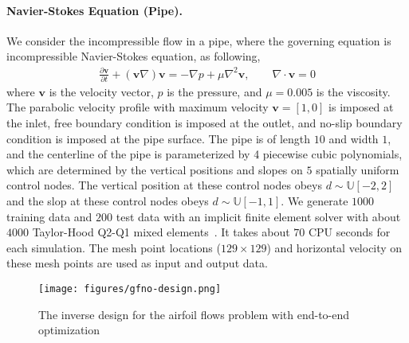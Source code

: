 \documentclass{article}
\begin{document}
\paragraph{Navier-Stokes Equation (Pipe).}
We consider the incompressible flow in a pipe, where the governing equation is incompressible Navier-Stokes equation, as following, 
 \begin{align*}
\frac{\partial \bm{v}}{\partial t} + (\bm{v}  \nabla) \bm{v} =-\nabla p + \mu \nabla^2 \bm{v}, \quad \quad 
\nabla  \cdot  \bm{v} = 0
\end{align*}
where $\bm{v}$ is the velocity vector, $p$ is the pressure, and $\mu = 0.005$ is the viscosity. The parabolic velocity profile with maximum velocity $\bm{v} = [1, 0]$ is imposed at the inlet, free boundary condition is imposed at the outlet, and no-slip boundary condition is imposed at the pipe surface.
The pipe is of length $10$ and width $1$, and the centerline of the pipe is parameterized by 4 piecewise cubic polynomials, which are determined by the vertical positions and slopes on $5$ spatially uniform control nodes. The vertical position at these control nodes obeys  $d\sim \mathbb{U}[-2, 2]$ and the slop at these control nodes obeys  $d\sim \mathbb{U}[-1, 1]$.
We generate $1000$ training data and $200$ test data with an implicit finite element solver with about $4000$ Taylor-Hood Q2-Q1 mixed elements~\cite{huang2020high}.
It takes about $70$ CPU seconds for each simulation.
The mesh point locations ($129\times 129$) and horizontal velocity on these mesh points are used as input and output data. 

\begin{figure}
    \centering
    \texttt{[image: figures/gfno-design.png]}
    \caption{The inverse design for the airfoil flows problem with end-to-end optimization}
    \label{fig:design}
\end{figure}
\end{document}
